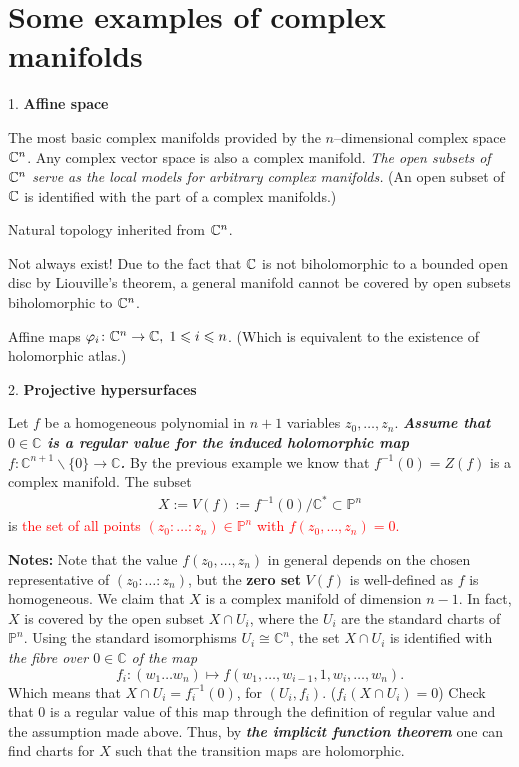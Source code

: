 \section{Some examples of complex manifolds}
1. \textbf{Affine space}

The most basic complex manifolds provided by the $n$--dimensional complex space ${\mathbb C}^n$. Any complex vector space is also a complex manifold. \textit{The open subsets of ${\mathbb C}^n$ serve as the local models for arbitrary complex manifolds.} (An open subset of ${\mathbb C}$ is identified with the part of a complex manifolds.)
\begin{description}[font=\upshape]
  \item[Topology] Natural topology inherited from ${\mathbb C}^n$. 
  \item[Open Covering] Not always exist! Due to the fact that ${\mathbb C}$ is not biholomorphic to a bounded open disc by Liouville's theorem, a general manifold cannot be covered by open subsets biholomorphic to ${\mathbb C}^n$.
  \item[Isomorphic Transition Maps] Affine maps $\varphi_i\colon {\mathbb C}^n \to {\mathbb C}, \; 1\leqslant  i\leqslant n$.  (Which is equivalent to the existence of holomorphic atlas.)
\end{description}


2. \textbf{Projective hypersurfaces}

Let $f$ be a homogeneous polynomial in $n+1$ variables $z_0, \ldots, z_n$. \textit{\textbf{Assume that $0 \in \mathbb{C}$ is a regular value for the induced holomorphic map $f: \mathbb{C}^{n+1} \backslash\{0\} \rightarrow \mathbb{C}$.}} By the previous example we know that $f^{-1}(0)=Z(f)$ is a complex manifold. The subset
\begin{align*}
X:=V(f):=f^{-1}(0) / \mathbb{C}^* \subset \mathbb{P}^n
\end{align*}
is \textcolor{red}{the set of all points $\left(z_0: \ldots: z_n\right) \in \mathbb{P}^n$ with $f\left(z_0, \ldots, z_n\right)=0$. }
\begin{key}{\bfseries Notes:}
Note that the value $f\left(z_0, \ldots, z_n\right)$ in general depends on the chosen representative of $\left(z_0: \ldots: z_n\right)$, but the \textbf{zero set} $V(f)$ is well-defined as $f$ is homogeneous. We claim that $X$ is a complex manifold of dimension $n-1$. In fact, $X$ is covered by the open subset $X \cap U_i$, where the $U_i$ are the standard charts of $\mathbb{P}^n$. Using the standard isomorphisms $U_i \cong \mathbb{C}^n$, the set $X \cap U_i$ is identified with \textit{the fibre over $0 \in \mathbb{C}$ of the map }
\[f_i:\left(w_1 \ldots w_n\right) \mapsto f\left(w_1, \ldots, w_{i-1}, 1, w_i, \ldots, w_n\right). \]
Which means that $X\cap U_i=f_i^{-1}(0)$, for $(U_i,f_i)$. ($f_i (X\cap U_i)=0$)
Check that 0 is a regular value of this map through the definition of regular value and the assumption made above. Thus, by \textit{\textbf{the implicit function theorem}} one can find charts for $X$ such that the transition maps are holomorphic.
\end{key}

